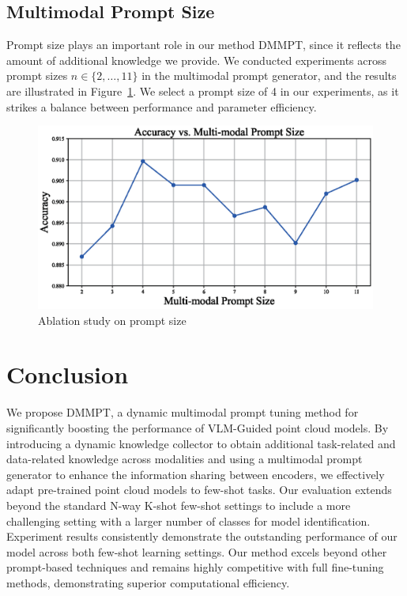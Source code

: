 \documentclass{ecai}
\begin{document}
\subsection{Multimodal Prompt Size}
Prompt size plays an important role in our method DMMPT, since it reflects the amount of additional knowledge we provide. We conducted experiments across prompt sizes $n\in \{2, \ldots, 11\}$ in the multimodal prompt generator, and the results are illustrated in Figure~\ref{promptSize}. We select a prompt size of 4 in our experiments, as it strikes a balance between performance and parameter efficiency.
\begin{figure}[th]
\centerline{\includegraphics[width=0.9\linewidth]{promptSize.eps}}
\caption{Ablation study on prompt size } \label{promptSize}
\vspace{4pt}
\end{figure}
\section{Conclusion}\label{conclusion}
We propose DMMPT, a dynamic multimodal prompt tuning method for significantly boosting the performance of VLM-Guided point cloud models. By introducing a dynamic knowledge collector to obtain additional task-related and data-related knowledge across modalities and using a multimodal prompt generator to enhance the information sharing between encoders, we effectively adapt pre-trained point cloud models to few-shot tasks. Our evaluation extends beyond the standard N-way K-shot few-shot settings to include a more challenging setting with a larger number of classes for model identification. Experiment results consistently demonstrate the outstanding performance of our model across both few-shot learning settings. Our method excels beyond other prompt-based techniques and remains highly competitive with full fine-tuning methods, demonstrating superior computational efficiency.
\end{document}
